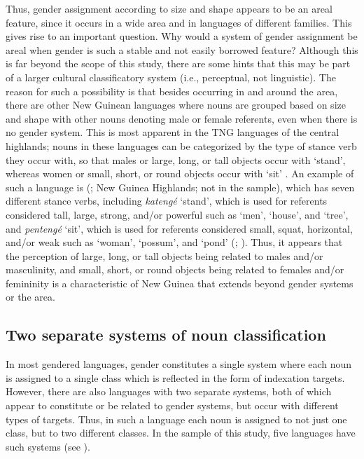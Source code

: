 \documentclass[output=collectionpaper]{langsci/langscibook}
\begin{document}
Thus, gender assignment according to size and shape appears to be an areal feature, since it occurs in a wide area and in languages of different families. This gives rise to an important question. Why would a system of gender assignment be areal when gender is such a stable and not easily borrowed feature?  Although this is far beyond the scope of this study, there are some hints that this may be part of a larger cultural classificatory system (i.e., perceptual, not linguistic). The reason for such a possibility is that besides occurring in and around the  area, there are other New Guinean languages where nouns are grouped based on size and shape with other nouns denoting male or female referents, even when there is no gender system. This is most apparent in the TNG languages of the central highlands; nouns in these languages can be categorized by the type of stance verb they occur with, so that males or large, long, or tall objects occur with `stand', whereas women or small, short, or round objects occur with `sit'  \citep[372]{Foley2000}. An example of such a language is  (; New Guinea Highlands; not in the sample), which has seven different stance verbs, including \textit{katengé} `stand', which is used for referents considered tall, large, strong, and/or powerful such as `men', `house', and `tree', and \textit{pentengé} `sit', which is used for referents considered small, squat, horizontal, and/or weak such as `woman', `possum', and `pond' (\citealt[158--159]{Aikhenvald2000}; \citealt{Rumsey2002}). Thus, it appears that the perception of large, long, or tall objects being related to males and/or masculinity, and small, short, or round objects being related to females and/or femininity is a characteristic of New Guinea that extends beyond gender systems or the  area.


\subsection{Two separate systems of noun classification}
\label{sec:Svard:5.2}

In most gendered languages, gender constitutes a single system where each noun is assigned to a single class which is reflected in the form of indexation targets. However, there are also languages with two separate systems, both of which appear to constitute or be related to gender systems, but occur with different types of targets. Thus, in such a language each noun is assigned to not just one class, but to two different classes. In the sample of this study, five languages have such systems (see ).
\end{document}

